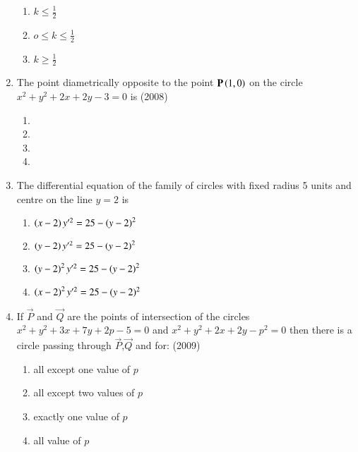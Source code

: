 \documentclass[journal,12pt,twocolumn]{IEEEtran}
\theoremstyle{remark}
\begin{document}
\begin{enumerate}[start=6]
\begin{multicols}{2}
\begin{enumerate}
\item $k \le \frac{1}{2}$
\item $o \le k \le \frac{1}{2}$
\item $k \ge \frac{1}{2}$
\end{enumerate}
\end{multicols}
\item The point diametrically opposite to the point $\mathbf{P}\left(1,0\right)$ on the circle $x^2+y^2+2x+2y-3=0$ is 
\hfill{(2008)}
\begin{multicols}{2}
\begin{enumerate}
\item {}
\item {}
\item {}
\item {}
\end{enumerate}
\end{multicols}
\item The differential equation of the family of circles with fixed radius 5 units and centre on the line $y=2$ is
\begin{enumerate}
\item $\left(x-2\right)y'^2=25-\left(y-2\right)^2$
\item $\left(y-2\right)y'^2=25-\left(y-2\right)^2$
\item $\left(y-2\right)^2y'^2=25-\left(y-2\right)^2$
\item $\left(x-2\right)^2y'^2=25-(y-2)^2$
\end{enumerate}
\item If $\vec{P}$ and $\vec{Q}$ are the points of intersection of the circles $x^2+y^2+3x+7y+2p-5=0$ and $x^2+y^2+2x+2y-p^2=0$ then there is a circle passing through $\vec{P}$,$\vec{Q}$ and  for:
\hfill{(2009)}
\begin{enumerate}
\item all except one value of $p$
\item all except two values of $p$
\item exactly one value of $p$
\item all value of $p$
\end{enumerate}
\end{enumerate}
\end{document}
